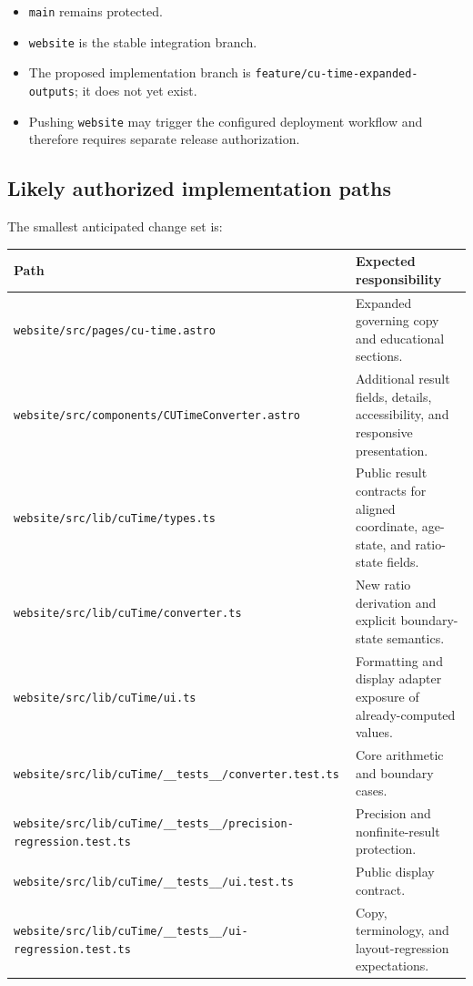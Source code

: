 \documentclass[11pt,letterpaper]{article}
\newcommand{\filepath}[1]{\nolinkurl{#1}}
\newcommand{\branchname}[1]{\texttt{#1}}
\begin{document}
\begin{itemize}
    \item \branchname{main} remains protected.
    \item \branchname{website} is the stable integration branch.
    \item The proposed implementation branch is
          \branchname{feature/cu-time-expanded-outputs}; it does not yet exist.
    \item Pushing \branchname{website} may trigger the configured deployment
          workflow and therefore requires separate release authorization.
\end{itemize}

\subsection{Likely authorized implementation paths}

The smallest anticipated change set is:

\begin{longtable}{L{3.0in}L{3.35in}}
\toprule
\textbf{Path} & \textbf{Expected responsibility} \\
\midrule
\filepath{website/src/pages/cu-time.astro} & Expanded governing copy and educational sections. \\
\filepath{website/src/components/CUTimeConverter.astro} & Additional result fields, details, accessibility, and responsive presentation. \\
\filepath{website/src/lib/cuTime/types.ts} & Public result contracts for aligned coordinate, age-state, and ratio-state fields. \\
\filepath{website/src/lib/cuTime/converter.ts} & New ratio derivation and explicit boundary-state semantics. \\
\filepath{website/src/lib/cuTime/ui.ts} & Formatting and display adapter exposure of already-computed values. \\
\filepath{website/src/lib/cuTime/__tests__/converter.test.ts} & Core arithmetic and boundary cases. \\
\filepath{website/src/lib/cuTime/__tests__/precision-regression.test.ts} & Precision and nonfinite-result protection. \\
\filepath{website/src/lib/cuTime/__tests__/ui.test.ts} & Public display contract. \\
\filepath{website/src/lib/cuTime/__tests__/ui-regression.test.ts} & Copy, terminology, and layout-regression expectations. \\
\bottomrule
\end{longtable}
\end{document}
